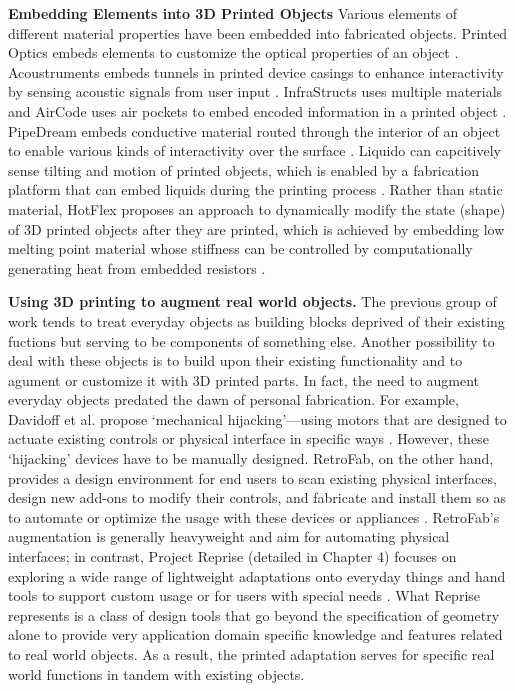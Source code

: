\textbf{Embedding Elements into 3D Printed Objects}
Various elements of different material properties have been embedded into fabricated objects. Printed Optics embeds elements to customize the optical properties of an object \cite{willis2012printed}. Acoustruments embeds tunnels in printed device casings to enhance interactivity by sensing acoustic signals from user input \cite{laput2015acoustruments}. InfraStructs uses multiple materials and AirCode uses air pockets to embed encoded information in a printed object \cite{willis2013infrastructs, li2017aircode}. PipeDream embeds conductive material routed through the interior of an object to enable various kinds of interactivity over the surface \cite{savage2014series}. Liquido can capcitively sense tilting and motion of printed objects, which is enabled by a fabrication platform that can embed liquids during the printing process \cite{schmitz2016liquido}. Rather than static material, HotFlex proposes an approach to dynamically modify the state (shape) of 3D printed objects after they are printed, which is achieved by embedding low melting point material whose stiffness can be controlled by computationally generating heat from embedded resistors \cite{groeger2016hotflex}.

\textbf{Using 3D printing to augment real world objects.} The previous group of work tends to treat everyday objects as building blocks deprived of their existing fuctions but serving to be components of something else. Another possibility to deal with these objects is to build upon their existing functionality and to agument or customize it with 3D printed parts. In fact, the need to augment everyday objects predated the dawn of personal fabrication. For example, Davidoff et al. propose `mechanical hijacking'---using motors that are designed to actuate existing controls or physical interface in specific ways \cite{davidoff2011mechanical}. However, these `hijacking' devices have to be manually designed. RetroFab, on the other hand, provides a design environment for end users to scan existing physical interfaces, design new add-ons to modify their controls, and fabricate and install them so as to automate or optimize the usage with these devices or appliances \cite{ramakers2016retrofab}. RetroFab's augmentation is generally heavyweight and aim for automating physical interfaces; in contrast, Project Reprise (detailed in Chapter 4) focuses on exploring a wide range of lightweight adaptations onto everyday things and hand tools to support custom usage or for users with special needs \cite{chen2016reprise}. What Reprise represents is a class of design tools that go beyond the specification of geometry alone to provide very application domain specific knowledge and features related to real world objects. As a result, the printed adaptation serves for specific real world functions in tandem with existing objects.

